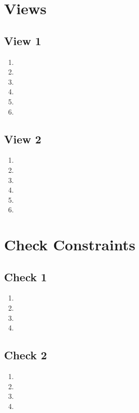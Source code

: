 \documentclass[a4paper,11pt]{article}
\begin{document}
\section{Views}

\subsection*{View 1}
\begin{enumerate}[label=(\alph*)]
    \item
    \item
    \item
    \item
    \item
    \item
\end{enumerate}


\subsection*{View 2}
\begin{enumerate}[label=(\alph*)]
    \item
    \item
    \item
    \item
    \item
    \item
\end{enumerate}

\section{Check Constraints}
\subsection*{Check 1}
\begin{enumerate}[label=(\alph*)]
    \item
    \item
    \item
    \item
\end{enumerate}

\subsection*{Check 2}
\begin{enumerate}[label=(\alph*)]
    \item
    \item
    \item
    \item
\end{enumerate}
\end{document}
